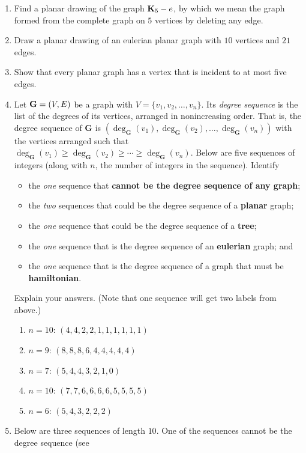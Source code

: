 \begin{enumerate}
\item Find a planar drawing of the graph $\mathbf{K}_5-e$, by which we mean
  the graph formed from the complete graph on $5$ vertices by deleting
  any edge.
\item Draw a planar drawing of an eulerian planar graph with $10$
  vertices and $21$ edges.
\item Show that every planar graph has a vertex that is incident to at
  most five edges.
\item \label{ex:graphs:degseq}Let $\mathbf{G}=(V,E)$ be a graph with $V=\{v_1,v_2,\dots,v_n\}$. Its
  \emph{degree sequence} is the list of the degrees of its vertices,
  arranged in nonincreasing order. That is, the degree sequence of
  $\mathbf{G}$ is
  $(\deg_\mathbf{G}(v_1),\deg_\mathbf{G}(v_2),\dots,\deg_\mathbf{G}(v_n))$
  with the vertices arranged such that $\deg_\mathbf{G}(v_1) \geq
  \deg_\mathbf{G}(v_2)\geq \cdots\geq \deg_\mathbf{G}(v_n)$. Below
  are five sequences of integers (along with $n$, the number of
  integers in the sequence). Identify
  \begin{itemize}
  \item the \textit{one} sequence that \textbf{cannot be the degree
      sequence of any graph};
  \item the \textit{two} sequences that could be the degree sequence
    of a \textbf{planar} graph;
  \item the \textit{one} sequence that could be the degree sequence of
    a \textbf{tree};
  \item the \textit{one} sequence that is the degree sequence of
    an \textbf{eulerian} graph; and
  \item the \textit{one} sequence that is the degree sequence of a
    graph that must be \textbf{hamiltonian}.
  \end{itemize}
  Explain your answers. (Note that one sequence will get two labels
  from above.)
  \begin{enumerate}
  \item $n=10$: $(4,4,2,2,1,1,1,1,1,1)$
  \item $n=9$: $(8,8,8,6,4,4,4,4,4)$
  \item $n=7$: $(5,4,4,3,2,1,0)$
  \item $n=10$: $(7,7,6,6,6,6,5,5,5,5)$
  \item $n=6$: $(5,4,3,2,2,2)$
  \end{enumerate}
\item \label{ex:graphs:degseq2} Below are three sequences of length $10$. One of the sequences
  cannot be the degree sequence (see

\end{enumerate}
